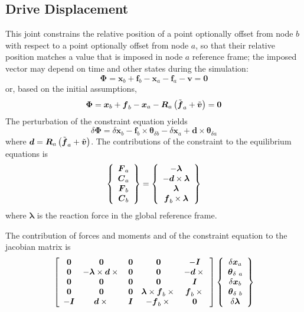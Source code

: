 \documentclass[10pt,dvips]{report}
\newcommand{\T}[1]{\boldsymbol{#1}}
\begin{document}
\subsection{Drive Displacement}
This joint constrains the relative position of a point optionally offset 
from node $b$ with respect to a point optionally offset from node $a$, 
so that their relative position matches a value that is imposed in node $a$ 
reference frame; the imposed vector may depend on time and other states
during the simulation:
\begin{equation}
	\T{\Phi} = \T{x}_b + \T{f}_b - \T{x}_a - \T{f}_a - \T{v} = \T{0}
\end{equation}
or, based on the initial assumptions,
\begin{equation}
	\T{\Phi} = \T{x}_b + \T{f}_b - \T{x}_a
		- \T{R}_a\plbr{\tilde{\T{f}}_a + \tilde{\T{v}}} = \T{0}
\end{equation}
The perturbation of the constraint equation yields
\begin{equation}
	\delta\T{\Phi} = 
		\delta\T{x}_b
		- \T{f}_b\times\T{\theta}_{\delta b}
		- \delta\T{x}_a
		+ \T{d}\times\T{\theta}_{\delta a}
\end{equation}
where $\T{d}=\T{R}_a\plbr{\tilde{\T{f}}_a + \tilde{\T{v}}}$.
The contributions of the constraint to the equilibrium equations is
\begin{equation}
	\cubr{\cvvect{
		\T{F}_a \\
		\T{C}_a \\
		\T{F}_b \\
		\T{C}_b
	}} = \cubr{\cvvect{
		- \T{\lambda} \\
		- \T{d}\times\T{\lambda} \\
		\T{\lambda} \\
		\T{f}_b\times\T{\lambda}
	}}
\end{equation}
where $\T{\lambda}$ is the reaction force in the global reference frame.

The contribution of forces and moments and of the constraint equation 
to the jacobian matrix is
\begin{equation}
	\sqbr{\matr{ccccc}{
		\T{0} & \T{0} & \T{0} & \T{0} & - \T{I} \\
		\T{0} & - \T{\lambda}\times\T{d}\times{} & \T{0} & \T{0} & - \T{d}\times{}\\
		\T{0} & \T{0} & \T{0} & \T{0} & \T{I} \\
		\T{0} & \T{0} & \T{0} & \T{\lambda}\times\T{f}_b\times{} & \T{f}_b\times{} \\
		- \T{I} & \T{d}\times{} & \T{I} & - \T{f}_b\times{} & \T{0}
	}}\cubr{\cvvect{
		\delta\T{x}_a \\
		\T{\theta}_{\delta \ a} \\
		\delta\T{x}_b \\
		\T{\theta}_{\delta \ b} \\
		\delta\T{\lambda}
	}}
\end{equation}
\end{document}
